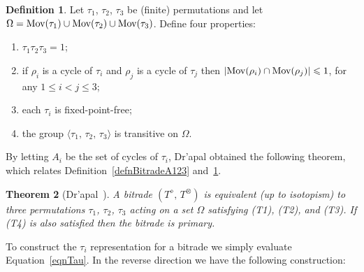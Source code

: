 \documentclass[amstags,fleqn,reqno]{article}
\theoremstyle{plain}
\newtheorem{theorem}{Theorem}[section]
\theoremstyle{definition}
\newtheorem{definition}[theorem]{Definition}
\renewcommand\leq{\leqslant}
\newcommand{\fpf}{fixed-point-free\xspace}
\newcommand{\Tidentity}{\textnormal{(T1)}\xspace}
\newcommand{\Tcycledisjoint}{\textnormal{(T2)}\xspace}
\newcommand{\Tfpf}{\textnormal{(T3)}\xspace}
\newcommand{\Ttransitive}{\textnormal{(T4)}\xspace}
\newcommand{\darts}{\Omega\xspace}
\newcommand{\opa}{\diamond}
\newcommand{\opb}{\otimes}
\newcommand{\mov}{\textnormal{Mov}}
\begin{document}
\begin{definition}\label{defnT1234}
Let $\tau_1$, $\tau_2$, $\tau_3$ be (finite) permutations
and let $\darts = \mov(\tau_1) \cup \mov(\tau_2) \cup \mov(\tau_3)$.  
Define four properties:
\begin{enumerate}

\item[\Tidentity] $\tau_1 \tau_2 \tau_3 = 1$;

\item[\Tcycledisjoint] if $\rho_i$ is a cycle of $\tau_i$
and $\rho_j$ is a cycle of $\tau_j$
then $\left| \mov(\rho_i) \cap \mov(\rho_j) \right| \leq 1$,
for any $1 \leq i < j \leq 3$;

\item[\Tfpf] each $\tau_i$ is \fpf;

\item[\Ttransitive] the group $\langle \tau_1,\, \tau_2,\, \tau_3 \rangle$ is
transitive on $\darts$.
\end{enumerate}

\end{definition}

By letting $A_i$ be the set of cycles of $\tau_i$, Dr\a'apal obtained
the following theorem, which relates
Definition~\ref{defnBitradeA123}
and~\ref{defnT1234}.  

\begin{theorem}[{Dr\a'apal~\cite{Dr9}}]\label{theoremDrapalTauStructure}
A bitrade $(T^{\opa},\, T^{\opb})$ is equivalent (up to isotopism) to three
permutations $\tau_1$, $\tau_2$, $\tau_3$ acting on a set $\darts$
satisfying \Tidentity, \Tcycledisjoint, and \Tfpf. 
If \Ttransitive is also satisfied then the bitrade is primary.
\end{theorem}

To construct the $\tau_i$ representation for a bitrade we simply evaluate
Equation~\eqref{eqnTau}. In the reverse direction we have the following
construction:
\end{document}
